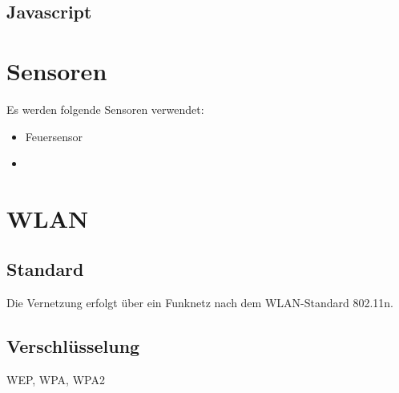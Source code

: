 \subsection{Javascript}

\section{Sensoren}

Es werden folgende Sensoren verwendet:

\begin{itemize}
\item Feuersensor
\item
\end{itemize}

\section{WLAN}
\subsection{Standard} %

Die Vernetzung erfolgt über ein Funknetz nach dem WLAN-Standard 802.11n. 

\subsection{Verschl\"usselung}
WEP, WPA, WPA2


